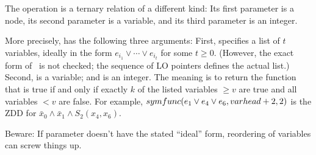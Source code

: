 The  operation is a ternary relation of a different
kind:
Its first parameter is a node, its second parameter is a variable, and
its third parameter is an integer.

More precisely,  has the following three arguments:
First,  specifies
a list of $t$ variables, ideally in the form $e_{i_1}\lor\cdots\lor e_{i_t}$
for some $t\ge0$. (However, the exact form of~ is not checked; the
sequence of {\mc LO} pointers defines the actual list.)
Second,  is a variable; and  is an integer. The meaning is to
return the function that is true if and only if exactly $k$ of the
listed variables $\ge v$ are true and all variables $<v$ are false.
For example, $\relax{\\{symfunc}}(e_1\lor e_4\lor e_6,\relax{\\{varhead}}+2,2)$ is
the ZDD for $\bar x_0\land\bar x_1\land S_2(x_4,x_6)$.

Beware: If parameter  doesn't have the stated ``ideal'' form,
reordering of variables can screw things up.

